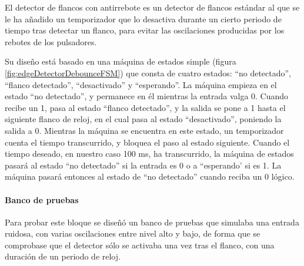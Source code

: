 El detector de flancos con antirrebote es un detector de flancos estándar al que se le ha añadido un temporizador que lo desactiva durante un cierto periodo de tiempo tras detectar un flanco, para evitar las oscilaciones producidas por los rebotes de los pulsadores.

Su diseño está basado en una máquina de estados simple (figura \ref{fig:edgeDetectorDebounceFSM}) que consta de cuatro estados: ``no detectado'', ``flanco detectado'', ``desactivado'' y ``esperando''. La máquina empieza en el estado ``no detectado'', y permanece en él mientras la entrada valga 0. Cuando recibe un 1, pasa al estado ``flanco detectado'', y la salida se pone a 1 hasta el siguiente flanco de reloj, en el cual pasa al estado
``desactivado'', poniendo la salida a 0. Mientras la máquina se encuentra en este estado, un temporizador cuenta el tiempo transcurrido, y bloquea el paso al estado siguiente. Cuando el tiempo deseado, en nuestro caso 100 ms,  ha transcurrido, la máquina de estados pasará al estado ``no detectado'' si la entrada es 0 o a ``esperando' si es 1. La máquina pasará entonces al estado de ``no detectado'' cuando reciba un 0 lógico.

\paragraph{Banco de pruebas}
Para probar este bloque se diseñó un banco de pruebas que simulaba una entrada ruidosa, con varias oscilaciones entre nivel alto y bajo, de forma que se comprobase que el detector sólo se activaba una vez tras el flanco, con una duración de un periodo de reloj.